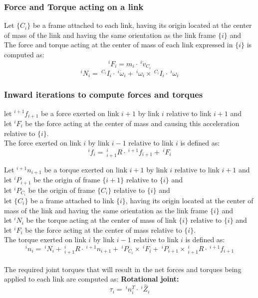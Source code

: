 \documentclass[10pt,a4paper]{article}
\begin{document}
\subsubsection{Force and Torque acting on a link}
Let $\{C_i\}$ be a frame attached to each link, having its origin located at the center of mass of the link and having the same orientation as the link frame $\{i\}$ and \\
The force and torque acting at the center of mass of each link expressed in $\{i\}$ is computed as:
$$
^iF_i = m_i ⋅ ~^i\dot v_{C_i}
$$
$$
^iN_i = ~^{C_i}I_i ⋅ ~^i\dot \omega_i + ~^i\omega_i \times ~^{C_i}I_i ⋅ ~^i\omega_i
$$

\subsubsection{Inward iterations to compute forces and torques}
let $^{i+1}f_{i+1}$ be a force exerted on link $i+1$ by link $i$ relative to link $i+1$ and \\
let $^iF_i$ be the force acting at the center of mass and causing this acceleration relative to $\{i\}$. \\
The force exerted on link $i$ by link $i-1$ relative to link $i$ is defined as:
$$
^if_i = ~^i_{i+1}R ⋅ ~^{i+1}f_{i+1} + ~^iF_i
$$

Let $^{i+1}n_{i+1}$ be a torque exerted on link $i+1$ by link $i$ relative to link $i+1$ and \\
let $^iP_{i+1}$ be the origin of frame $\{i+1\}$ relative to $\{i\}$ and \\
let $^iP_{C_i}$ be the origin of frame $\{C_i\}$ relative to $\{i\}$ and \\
let $\{C_i\}$ be a frame attached to link $\{i\}$, having its origin located at the center of mass of the link and having the same orientation as the link frame $\{i\}$ and \\
let $^iN_i$ be the torque acting at the center of mass of link $\{i\}$ relative to $\{i\}$ and \\
let $^iF_i$ be the force acting at the center of mass relative to $\{i\}$. \\
The torque exerted on link $i$ by link $i-1$ relative to link $i$ is defined as:
$$
^in_i = ~^iN_i + ~^i_{i+1}R ⋅ ~^{i+1}n_{i+1} + ~^iP_{C_i} \times ~^iF_i + ~^iP_{i+1} \times ~^i_{i+1}R ⋅ ~^{i+1}f_{i+1}
$$
\\

The required joint torques that will result in the net forces and torques being applied to each link are computed as:
\textbf{Rotational joint:} \\
$$
\tau_i = ~^in_i^T ⋅ ~^i\hat{Z}_i
$$
\end{document}
